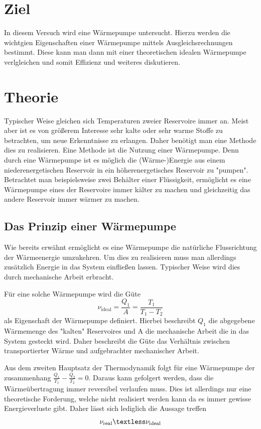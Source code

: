 \section{Ziel}
\label{sec:Theorie}
In diesem Versuch wird eine Wärmepumpe untersucht. Hierzu werden die wichtgien Eigenschaften einer Wärmepumpe mittels Ausgleichsrechnungen bestimmt. Diese kann man dann mit einer 
theoretischen idealen Wärmepumpe verlgleichen und somit Effizienz und weiteres diskutieren.
\section{Theorie}
\label{sec:Theorie}
Typischer Weise gleichen sich Temperaturen zweier Reservoire immer an. Meist aber ist es von größerem Interesse sehr kalte oder sehr warme Stoffe zu betrachten, um neue Erkenntnisse
zu erlangen. Daher benötigt man eine Methode dies zu realisieren. Eine Methode ist die Nutzung einer Wärmepumpe. Denn durch eine Wärmepumpe ist es möglich die (Wärme-)Energie aus 
einem niederenergetischen Reservoir in ein höherenergetisches Reservoir zu "pumpen". Betrachtet man beispielsweise zwei Behälter einer Flüssigkeit, ermöglicht es eine Wärmepumpe 
eines der Reservoire immer kälter zu machen und gleichzeitig das andere Reservoir immer wärmer zu machen.
\subsection{Das Prinzip einer Wärmepumpe}
\label{subsec:Prinzip}
Wie bereits erwähnt ermöglicht es eine Wärmepumpe die natürliche Flussrichtung der Wärmeenergie umzukehren. Um dies zu realisieren muss man allerdings zusätzlich Energie in das System
einfließen lassen. Typischer Weise wird dies durch mechanische Arbeit erbracht.


Für eine solche Wärmepumpe wird die Güte
\begin{equation}
    \label{Güte_ideal}
    \nu_{\text{ideal}} = \frac{Q_1}{A} = \frac{T_1}{T_1 - T_2}
\end{equation}
als Eigenschaft der Wärmepumpe definiert. Hierbei beschreibt $Q_1$ die abgegebene Wärmemenge des "kalten" Reservoires und A die mechanische Arbeit die in das System gesteckt wird.
Daher beschreibt die Güte das Verhältnis zwischen transportierter Wärme und aufgebrachter mechanischer Arbeit. 


Aus dem zweiten Hauptsatz der Thermodynamik folgt für eine Wärmepumpe der zusammenhang $\frac{Q_1}{T_1} - \frac{Q_2}{T_2} = 0$. Daraus kann gefolgert werden, dass die Wärmeübertragung 
immer reversibel verlaufen muss. Dies ist allerdings nur eine theoretische Forderung, welche nicht realisiert werden kann da es immer gewisse Energieverluste gibt. Daher lässt sich
lediglich die Aussage treffen 
\begin{equation*}
    \label{Güte_real}
    \nu_{\text{real}} \textless \nu_{\text{ideal}}
\end{equation*}

